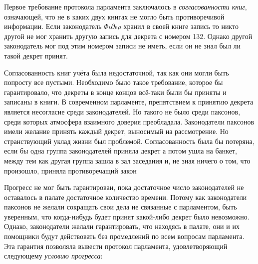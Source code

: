 \documentclass[12pt, a4paper]{article} %
\begin{document}
Первое требование протокола парламента заключалось в \textit{согласованности книг}, означающей, что не в каких двух книгах не могло быть противоречивой информации. Если законодатель $\Phi\iota\partial\epsilon\rho$ хранил в своей книге запись 
то никто другой не мог хранить другую запись для декрета с номером 132. Однако другой законодатель мог под этим номером записи не иметь, если он не знал был ли такой декрет принят.

Согласованность книг учёта была недостаточной, так как они могли быть попросту все пустыми. Необходимо было такое требование, которое бы гарантировало, что декреты в конце концов всё-таки были бы приняты и записаны в книги. В современном парламенте, препятствием к принятию декрета является несогласие среди законодателей. Но такого не было среди паксонов, среди которых  атмосфера взаимного доверия преобладала. Законодатели паксонов имели желание принять каждый декрет, выносимый на рассмотрение. Но странствующий уклад жизни был проблемой. Согласованность была бы потеряна, если бы одна группа законодателей приняла декрет 
а потом ушла на банкет, между тем как другая группа зашла в зал заседания и, не зная ничего о том, что произошло, приняла противоречащий закон 

Прогресс не мог быть гарантирован, пока достаточное число законодателей не оставалось в палате достаточное количество времени. Потому как законодатели паксонов не желали сокращать свои дела не связанные с парламентом, быть уверенным, что когда-нибудь будет принят какой-либо декрет было невозможно. Однако, законодатели желали гарантировать, что находясь в палате, они и их помощники будут действовать без промедлений по всем вопросам парламента. Эта гарантия позволяла вывести протокол парламента, удовлетворяющий следующему \textit{условию прогресса}:


\end{document}
